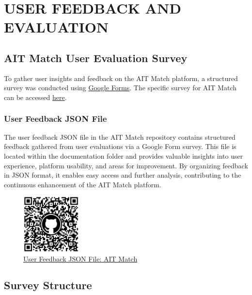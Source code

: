 \chapter{USER FEEDBACK AND EVALUATION}

\section{AIT Match User Evaluation Survey}

To gather user insights and feedback on the AIT Match platform, a structured survey was conducted using \href{https://www.google.com/forms/about/}{Google Forms}. The specific survey for AIT Match can be accessed \href{https://docs.google.com/forms/d/1XlQZTZruLfVGm9-heYvJwfkwZyfPvo1R_-ekUwJu0UU/viewform?edit_requested=true}{here}.

\subsection{User Feedback JSON File}

The user feedback JSON file in the AIT Match repository contains structured feedback gathered from user evaluations via a Google Form survey. This file is located within the documentation folder and provides valuable insights into user experience, platform usability, and areas for improvement. By organizing feedback in JSON format, it enables easy access and further analysis, contributing to the continuous enhancement of the AIT Match platform.

\begin{figure}[h]
\centering
\includegraphics[width=1.2in]{figures/qr-code-user-feedback.png}
\captionsetup{justification=centering, singlelinecheck=false, labelsep=space}
\caption{\href{https://github.com/werrnnnwerrrnnnnnn/AIT-Match/blob/main/documentation/user-feedback.json}{User Feedback JSON File: AIT Match}}
\label{fig:user_feedback_qr}
\end{figure}

\newpage
\section{Survey Structure}

